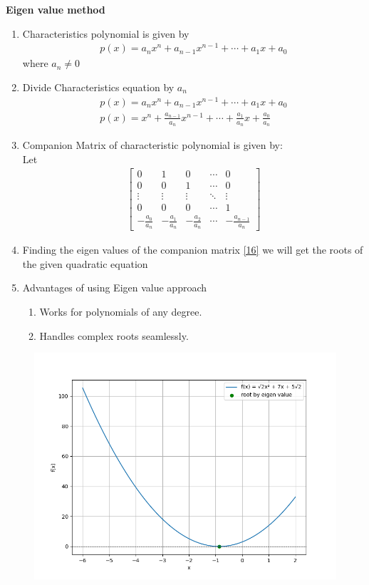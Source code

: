 \documentclass[journal]{IEEEtran}
\numberwithin{equation}{enumi}
\numberwithin{figure}{enumi}
\begin{document}
\begin{enumerate}
\textbf{Eigen value method}
\begin{enumerate}
\item Characteristics polynomial is given by
\begin{align}
 p(x)=a_nx^n+a_{n-1}x^{n-1}+\cdots +a_1x+a_0   
\end{align}
where $a_n \neq 0$
\item Divide Characteristics equation by $a_n$
\begin{align}
    p(x)= a_nx^n+a_{n-1}x^{n-1}+\cdots +a_1x+a_0     \\
    p(x)=x^n+\frac{a_{n-1}}{a_n}x^{n-1}+\cdots +\frac{a_1}{a_n}x+\frac{a_0}{a_n}
\end{align}
\item Companion Matrix of characteristic polynomial is given by:\\
Let
\begin{align}
    \begin{bmatrix}
0 & 1 & 0 & \cdots & 0 \\
0 & 0 & 1 & \cdots & 0 \\
\vdots & \vdots & \vdots & \ddots & \vdots \\
0 & 0 & 0 & \cdots & 1 \\
-\frac{a_0}{a_n} & -\frac{a_1}{a_n} & -\frac{a_2}{a_n} & \cdots & -\frac{a_{n-1}}{a_n}
\end{bmatrix}
\end{align}
\item Finding the eigen values of the companion matrix \eqref{16} we will get the roots of the given quadratic equation
\item Advantages of using Eigen value approach \\
\begin{enumerate}
    \item Works for polynomials of any degree.\\
    \item Handles complex roots seamlessly.\\
\end{enumerate}
\end{enumerate}



\end{enumerate}

\begin{figure}[h!]
   \centering
   \includegraphics[width=0.7\linewidth]{figs/fig.png}
\end{figure}
\end{document}

